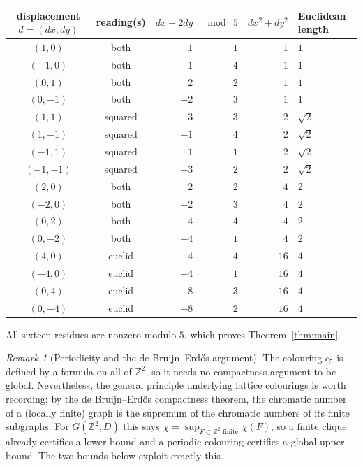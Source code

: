 \documentclass[11pt]{article}
\theoremstyle{definition}
\theoremstyle{remark}
\newtheorem{remark}[theorem]{Remark}
\newcommand{\Z}{\mathbb{Z}}
\newcommand{\chiG}{\chi}
\begin{document}
\begin{center}
\begin{tabular}{c c r r r l}
\toprule
displacement $d=(dx,dy)$ & reading(s) & $dx+2dy$ & $\bmod\ 5$
  & $dx^2+dy^2$ & Euclidean length \\
\midrule
$(1,0)$   & both    & $1$  & $1$ & $1$  & $1$ \\
$(-1,0)$  & both    & $-1$ & $4$ & $1$  & $1$ \\
$(0,1)$   & both    & $2$  & $2$ & $1$  & $1$ \\
$(0,-1)$  & both    & $-2$ & $3$ & $1$  & $1$ \\
$(1,1)$   & squared & $3$  & $3$ & $2$  & $\sqrt2$ \\
$(1,-1)$  & squared & $-1$ & $4$ & $2$  & $\sqrt2$ \\
$(-1,1)$  & squared & $1$  & $1$ & $2$  & $\sqrt2$ \\
$(-1,-1)$ & squared & $-3$ & $2$ & $2$  & $\sqrt2$ \\
$(2,0)$   & both    & $2$  & $2$ & $4$  & $2$ \\
$(-2,0)$  & both    & $-2$ & $3$ & $4$  & $2$ \\
$(0,2)$   & both    & $4$  & $4$ & $4$  & $2$ \\
$(0,-2)$  & both    & $-4$ & $1$ & $4$  & $2$ \\
$(4,0)$   & euclid  & $4$  & $4$ & $16$ & $4$ \\
$(-4,0)$  & euclid  & $-4$ & $1$ & $16$ & $4$ \\
$(0,4)$   & euclid  & $8$  & $3$ & $16$ & $4$ \\
$(0,-4)$  & euclid  & $-8$ & $2$ & $16$ & $4$ \\
\bottomrule
\end{tabular}
\end{center}

All sixteen residues are nonzero modulo $5$, which proves Theorem~\ref{thm:main}.

\begin{remark}[Periodicity and the de Bruijn--Erd\H{o}s argument]
The colouring $c_5$ is defined by a formula on all of $\Z^2$, so it needs no
compactness argument to be global. Nevertheless, the general principle
underlying lattice colourings is worth recording: by the de Bruijn--Erd\H{o}s
compactness theorem, the chromatic number of a (locally finite) graph is the
supremum of the chromatic numbers of its finite subgraphs. For
$G(\Z^2,D)$ this says $\chiG = \sup_{F \subset \Z^2 \text{ finite}} \chiG(F)$,
so a finite clique already certifies a lower bound and a periodic colouring
certifies a global upper bound. The two bounds below exploit exactly this.
\end{remark}
\end{document}
